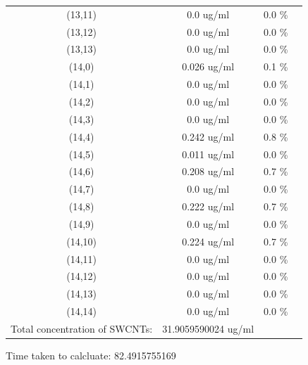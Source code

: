 \documentclass{article}
\begin{document}
\begin{tabular}{c c c c}
(13,11)&        0.0 ug/ml        &0.0 \%\\
(13,12)&        0.0 ug/ml        &0.0 \%\\
(13,13)&        0.0 ug/ml        &0.0 \%\\
(14,0)&        0.026 ug/ml        &0.1 \%\\
(14,1)&        0.0 ug/ml        &0.0 \%\\
(14,2)&        0.0 ug/ml        &0.0 \%\\
(14,3)&        0.0 ug/ml        &0.0 \%\\
(14,4)&        0.242 ug/ml        &0.8 \%\\
(14,5)&        0.011 ug/ml        &0.0 \%\\
(14,6)&        0.208 ug/ml        &0.7 \%\\
(14,7)&        0.0 ug/ml        &0.0 \%\\
(14,8)&        0.222 ug/ml        &0.7 \%\\
(14,9)&        0.0 ug/ml        &0.0 \%\\
(14,10)&        0.224 ug/ml        &0.7 \%\\
(14,11)&        0.0 ug/ml        &0.0 \%\\
(14,12)&        0.0 ug/ml        &0.0 \%\\
(14,13)&        0.0 ug/ml        &0.0 \%\\
(14,14)&        0.0 ug/ml        &0.0 \%\\
Total concentration of SWCNTs: &31.9059590024 ug/ml\\

\end{tabular}Time taken to calcluate: 82.4915755169
\end{document}
